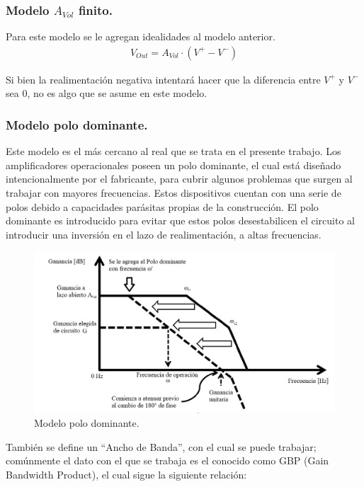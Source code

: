 \subsubsection{Modelo $A_{Vol}$ finito.}
Para este modelo se le agregan idealidades al modelo anterior.
\begin{align}V_{Out} = A_{Vol} \cdot (V^+ - V^-)
\label{eq:vout}
\end{align}

Si bien la realimentación negativa intentará hacer que la diferencia entre $V^+$ y $V^-$ sea 0, no es algo que se asume en este modelo.

\subsubsection{Modelo polo dominante.}
Este modelo es el más cercano al real que se trata en el presente trabajo. Los amplificadores operacionales poseen un polo dominante, el cual está diseñado intencionalmente por el fabricante, para cubrir algunos problemas que surgen al trabajar con mayores frecuencias. Estos dispositivos cuentan con una serie de polos debido a capacidades parásitas propias de la construcción. El polo dominante es introducido para evitar que estos polos desestabilicen el circuito al introducir una inversión en el lazo de realimentación, a altas frecuencias.

\begin{figure}[H]	
	\centering
	\includegraphics[width=\textwidth]{Ejercicio1/Imagenes/dompole.png}
	\caption{Modelo polo dominante.}
	\label{fig:dompole}
\end{figure}

También se define un ``Ancho de Banda'', con el cual se puede trabajar; comúnmente el dato con el que se trabaja es el conocido como GBP (Gain Bandwidth Product), el cual sigue la siguiente relación:

